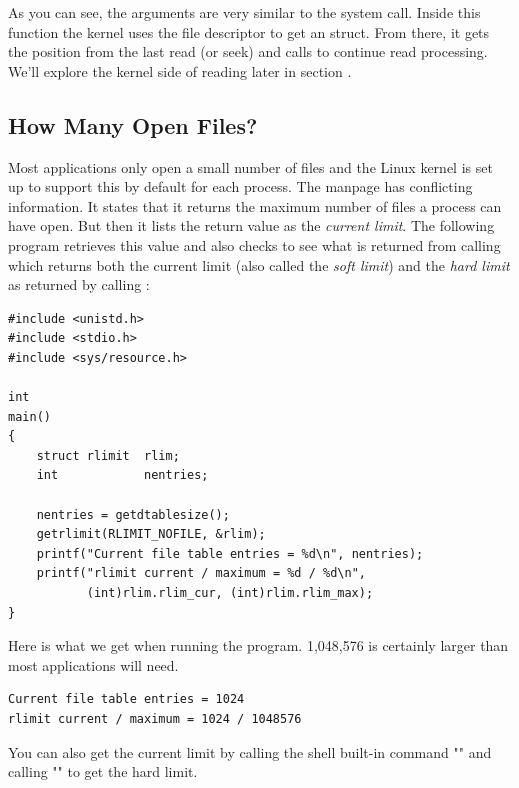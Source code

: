 \noindent
As you can see, the arguments are very similar to the  system call. Inside this function the kernel uses the file descriptor to get an  struct. From there, it gets the position from the last read (or seek) and calls  to continue read processing. We'll explore the kernel side of reading later in section .


\subsection{How Many Open Files?}

Most applications only open a small number of files and the Linux kernel is set up to support this by default for each process. The  manpage has conflicting information. It states that it returns the maximum number of files a process can have open. But then it lists the return value as the \textit{current limit}. The following program retrieves this value and also checks to see what is returned from calling  which returns both the current limit (also called the \textit{soft limit}) and the \textit{hard limit} as returned by calling :

\begin{lstlisting}
#include <unistd.h>
#include <stdio.h>
#include <sys/resource.h>

int
main()
{
    struct rlimit  rlim;
    int            nentries;

    nentries = getdtablesize();
    getrlimit(RLIMIT_NOFILE, &rlim);
    printf("Current file table entries = %d\n", nentries);
    printf("rlimit current / maximum = %d / %d\n",
           (int)rlim.rlim_cur, (int)rlim.rlim_max);
}
\end{lstlisting}

\noindent
Here is what we get when running the program. 1,048,576 is certainly larger than most applications will need.

\begin{lstlisting}
Current file table entries = 1024
rlimit current / maximum = 1024 / 1048576
\end{lstlisting}

\noindent
You can also get the current limit by calling the shell built-in command "" and calling "" to get the hard limit.

